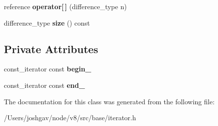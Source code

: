 \begin{DoxyCompactItemize}
\item 
reference {\bfseries operator\mbox{[}$\,$\mbox{]}} (difference\+\_\+type n)\hypertarget{classv8_1_1base_1_1iterator__range_a0c369ce5a2faf3b78836aeb931a01db3}{}\label{classv8_1_1base_1_1iterator__range_a0c369ce5a2faf3b78836aeb931a01db3}

\item 
difference\+\_\+type {\bfseries size} () const \hypertarget{classv8_1_1base_1_1iterator__range_a855c3ad747bfcf4b0686c76d93308431}{}\label{classv8_1_1base_1_1iterator__range_a855c3ad747bfcf4b0686c76d93308431}

\end{DoxyCompactItemize}
\subsection*{Private Attributes}
\begin{DoxyCompactItemize}
\item 
const\+\_\+iterator const {\bfseries begin\+\_\+}\hypertarget{classv8_1_1base_1_1iterator__range_a45666932b7166871311a2589ee0edb6b}{}\label{classv8_1_1base_1_1iterator__range_a45666932b7166871311a2589ee0edb6b}

\item 
const\+\_\+iterator const {\bfseries end\+\_\+}\hypertarget{classv8_1_1base_1_1iterator__range_a59407e979225289d02912d0f54a1311e}{}\label{classv8_1_1base_1_1iterator__range_a59407e979225289d02912d0f54a1311e}

\end{DoxyCompactItemize}


The documentation for this class was generated from the following file\+:\begin{DoxyCompactItemize}
\item 
/\+Users/joshgav/node/v8/src/base/iterator.\+h\end{DoxyCompactItemize}
